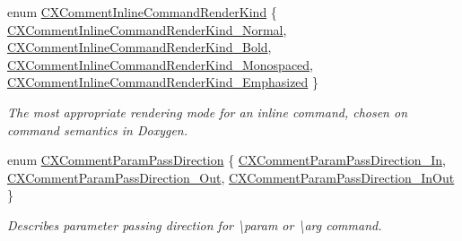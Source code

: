 \begin{DoxyCompactItemize}
\item 
enum \hyperlink{group__CINDEX__COMMENT_ga23efacd9c1e4e286a9f9714e1720fdcf}{C\+X\+Comment\+Inline\+Command\+Render\+Kind} \{ \hyperlink{group__CINDEX__COMMENT_gga23efacd9c1e4e286a9f9714e1720fdcfa83c59bf303aff52a2ebb2a4ac639ba1e}{C\+X\+Comment\+Inline\+Command\+Render\+Kind\+\_\+\+Normal}, 
\hyperlink{group__CINDEX__COMMENT_gga23efacd9c1e4e286a9f9714e1720fdcfac53920a0bf8aa489b8ba71bea3552c6c}{C\+X\+Comment\+Inline\+Command\+Render\+Kind\+\_\+\+Bold}, 
\hyperlink{group__CINDEX__COMMENT_gga23efacd9c1e4e286a9f9714e1720fdcfa24ed7a03d9514af7268cca4cbd756569}{C\+X\+Comment\+Inline\+Command\+Render\+Kind\+\_\+\+Monospaced}, 
\hyperlink{group__CINDEX__COMMENT_gga23efacd9c1e4e286a9f9714e1720fdcfa0a20ae12d7c3a4a8cb8b064497a35410}{C\+X\+Comment\+Inline\+Command\+Render\+Kind\+\_\+\+Emphasized}
 \}\begin{DoxyCompactList}\small\item\em The most appropriate rendering mode for an inline command, chosen on command semantics in Doxygen. \end{DoxyCompactList}
\item 
enum \hyperlink{group__CINDEX__COMMENT_gafadf6e52217ea74d1a014198df656ee1}{C\+X\+Comment\+Param\+Pass\+Direction} \{ \hyperlink{group__CINDEX__COMMENT_ggafadf6e52217ea74d1a014198df656ee1a4f3a96a7ded21c670b2a7454518dd533}{C\+X\+Comment\+Param\+Pass\+Direction\+\_\+\+In}, 
\hyperlink{group__CINDEX__COMMENT_ggafadf6e52217ea74d1a014198df656ee1a08ec465aa9d53cecb76ee77209bdafac}{C\+X\+Comment\+Param\+Pass\+Direction\+\_\+\+Out}, 
\hyperlink{group__CINDEX__COMMENT_ggafadf6e52217ea74d1a014198df656ee1a26ad093a44adda407f28a65e6b1e4e8b}{C\+X\+Comment\+Param\+Pass\+Direction\+\_\+\+In\+Out}
 \}\begin{DoxyCompactList}\small\item\em Describes parameter passing direction for \textbackslash{}param or \textbackslash{}arg command. \end{DoxyCompactList}
\end{DoxyCompactItemize}
